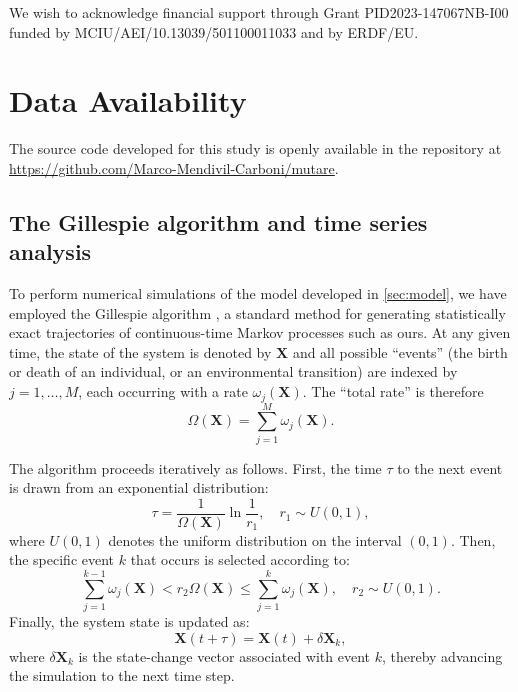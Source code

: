 \documentclass[aps,pre,reprint,10pt,superscriptaddress]{revtex4-2}
\begin{document}
\begin{acknowledgments}
    We wish to acknowledge financial support through Grant PID2023-147067NB-I00 funded by MCIU\slash AEI\slash 10.13039\slash 501100011033 and by ERDF/EU.
\end{acknowledgments}

\section*{Data Availability}
The source code developed for this study is openly available in the repository at \url{https://github.com/Marco-Mendivil-Carboni/mutare}.

\begin{appendices}

    \section{The Gillespie algorithm and time series analysis} \label{sec:gillespie_algorithm}

    To perform numerical simulations of the model developed in \cref{sec:model}, we have employed the Gillespie algorithm \cite{toralStochasticNumericalMethods}, a standard method for generating statistically exact trajectories of continuous-time Markov processes such as ours. At any given time, the state of the system is denoted by $\mathbf{X}$ and all possible ``events'' (the birth or death of an individual, or an environmental transition) are indexed by $j=1,\dots,M$, each occurring with a rate $\omega_j(\mathbf{X})$. The ``total rate'' is therefore
    \begin{equation}
        \Omega(\mathbf{X})=\sum_{j=1}^M\omega_j(\mathbf{X}).
    \end{equation}

    The algorithm proceeds iteratively as follows. First, the time $\tau$ to the next event is drawn from an exponential distribution:
    \begin{equation}
        \tau=\frac{1}{\Omega(\mathbf{X})}\ln\frac{1}{r_1},\quad r_1\sim U(0,1),
    \end{equation}
    where $U(0,1)$ denotes the uniform distribution on the interval $(0,1)$. Then, the specific event $k$ that occurs is selected according to:
    \begin{equation}
        \sum_{j=1}^{k-1}\omega_j(\mathbf{X})<r_2\Omega(\mathbf{X})\le\sum_{j=1}^{k}\omega_j(\mathbf{X}),\quad r_2\sim U(0,1).
    \end{equation}
    Finally, the system state is updated as:
    \begin{equation}
        \mathbf{X}(t+\tau)=\mathbf{X}(t)+\delta\mathbf{X}_k,
    \end{equation}
    where $\delta\mathbf{X}_k$ is the state-change vector associated with event $k$, thereby advancing the simulation to the next time step.


\end{appendices}
\end{document}
